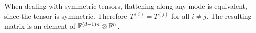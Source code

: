 \documentclass[../Lael_John_MasterThesis_Draft.tex]{subfiles}
\begin{document}
When dealing with symmetric tensors, flattening along any mode is equivalent, since the tensor is symmetric. Therefore $T^{(i)} = T^{(j)}$ for all $i \neq j$. The resulting matrix is an element of $\mathbb{F}^{(d-1)n} \otimes \mathbb{F}^n$.

\end{document}
